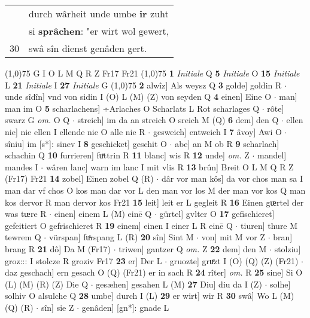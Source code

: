 \documentclass[8pt,a4paper,notitlepage]{article}
\begin{document}
\begin{table}[ht]
\begin{minipage}[t]{0.5\linewidth}
\begin{tabular}{rl}
 & durch wârheit unde umbe \textbf{ir} zuht\\ 
 & si \textbf{sprâchen}: "er wirt wol gewert,\\ 
30 & swâ sîn dienst genâden gert.\\ 
\end{tabular}
\scriptsize
\line(1,0){75} \newline
G I O L M Q R Z Fr17 Fr21 \newline
\line(1,0){75} \newline
\textbf{1} \textit{Initiale} Q  \textbf{5} \textit{Initiale} O  \textbf{15} \textit{Initiale} L  \textbf{21} \textit{Initiale} I  \textbf{27} \textit{Initiale} G  \newline
\line(1,0){75} \newline
\textbf{2} alwîz] Als weysz Q \textbf{3} golde] goldin R  $\cdot$ unde sîdîn] vnd von sidin I (O) L (M) (Z) von seyden Q \textbf{4} einen] Eine O  $\cdot$ man] man im O \textbf{5} scharlachens] ÷Arlaches O Scharlats L Rot scharlages Q  $\cdot$ rôte] swarz G \textit{om.} O Q  $\cdot$ streich] im da an streich O sreich M (Q) \textbf{6} dem] den Q  $\cdot$ ellen nie] nie ellen I ellende nie O alle nie R  $\cdot$ gesweich] entweich I \textbf{7} âvoy] Awi O  $\cdot$ sîniu] im [s*]: sinev I \textbf{8} geschicket] geschit O  $\cdot$ abe] an M ob R \textbf{9} scharlach] schachin Q \textbf{10} furrieren] fuͯttrin R \textbf{11} blanc] wis R \textbf{12} unde] \textit{om.} Z  $\cdot$ mandel] mandes I  $\cdot$ wâren lanc] warn im lanc I mit vlis R \textbf{13} brûn] Breit O L M Q R Z (Fr17) Fr21 \textbf{14} zobel] Einen zobel Q (R)  $\cdot$ dâr vor man kôs] da vor chos man sa I man dar vf chos O kos man dar vor L den man vor los M der man vor kos Q man kos dervor R man dervor kos Fr21 \textbf{15} leit] leit er L gegleit R \textbf{16} Einen gᵫrtel der was tᵫre R  $\cdot$ einen] einem L (M) einē Q  $\cdot$ gürtel] gvlter O \textbf{17} gefischieret] gefeitiert O gefrischieret R \textbf{19} einem] einen I einer L R einē Q  $\cdot$ tiuren] thure M tewrem Q  $\cdot$ vürspan] fuͯrspang L (R) \textbf{20} sîn] Sint M  $\cdot$ von] mit M vor Z  $\cdot$ bran] brang R \textbf{21} dô] Da M (Fr17)  $\cdot$ triwen] gantzer Q \textit{om.} Z \textbf{22} dem] den M  $\cdot$ stolziu] groz::: I stolcze R groziv Fr17 \textbf{23} er] Der L  $\cdot$ gruozte] gruͤzt I (O) (Q) (Z) (Fr21)  $\cdot$ daz geschach] ern gesach O (Q) (Fr21) er in sach R \textbf{24} rîter] \textit{om.} R \textbf{25} sine] Si O (L) (M) (R) (Z) Die Q  $\cdot$ gesæhen] gesahen L (M) \textbf{27} Diu] diu da I (Z)  $\cdot$ solhe] solhiv O alsulche Q \textbf{28} umbe] durch I (L) \textbf{29} er wirt] wir R \textbf{30} swâ] Wo L (M) (Q) (R)  $\cdot$ sîn] sie Z  $\cdot$ genâden] [gn*]: gnade L \newline

\end{minipage}
\end{table}
\end{document}

